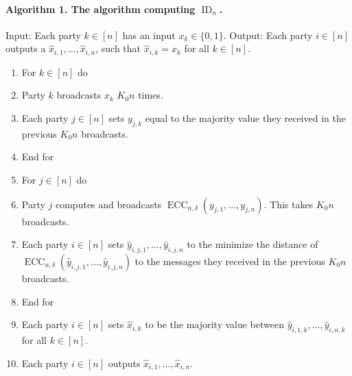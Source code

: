 \documentclass[10pt,a4paper]{article}
\begin{document}
\paragraph{Algorithm 1. The algorithm computing $\operatorname{ID}_n$.}
Input: Each party $k\in[n]$ has an input $x_k\in\{0,1\}$.
Output: Each party $i\in[n]$ outputs a $\hat x_{i,1},\ldots,\hat x_{i,n}$, such that $\hat x_{i,k}=x_k$ for all $k\in[n]$.
\begin{enumerate}
\item For $k\in[n]$ do
\item \quad Party $k$ broadcasts $x_k$ $K_0 n$ times.
\item \quad Each party $j\in[n]$ sets $y_{j,k}$ equal to the majority value they received in the previous $K_0 n$ broadcasts.
\item End for
\item For $j\in[n]$ do
\item \quad Party $j$ computes and broadcasts $\operatorname{ECC}_{n,\delta}(y_{j,1},\ldots,y_{j,n})$. This takes $K_0 n$ broadcasts.
\item \quad Each party $i\in[n]$ sets $\hat y_{i,j,1},\ldots,\hat y_{i,j,n}$ to the minimize the distance of $\operatorname{ECC}_{n,\delta}(\hat y_{i,j,1},\ldots,\hat y_{i,j,n})$ to the messages they received in the previous $K_0 n$ broadcasts.
\item End for
\item Each party $i\in[n]$ sets $\hat x_{i,k}$ to be the majority value between $\hat y_{i,1,k},\ldots,\hat y_{i,n,k}$ for all $k\in[n]$.
\item Each party $i\in[n]$ outputs $\hat x_{i,1},\ldots,\hat x_{i,n}$.
\end{enumerate}
\end{document}
